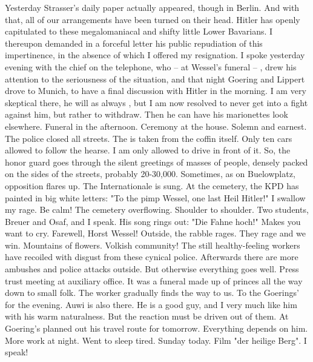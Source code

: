 Yesterday Strasser's daily paper actually appeared, though in Berlin. And with that, all of our arrangements have been turned on their head. Hitler has openly capitulated to these megalomaniacal and shifty little Lower Bavarians. I thereupon demanded in a forceful letter his public repudiation of this impertinence, in the absence of which I offered my resignation. I spoke yesterday evening with the chief on the telephone, who -- at Wessel's funeral -- , drew his attention to the seriousness of the situation, and  that night Goering and Lippert drove to Munich, to have a final discussion with Hitler in the morning. I am very skeptical there, he will as always , but I am now resolved to never get into a fight against him, but rather to withdraw. Then he can have his marionettes look elsewhere. Funeral in the afternoon. Ceremony at the house. Solemn and earnest. The police closed all streets. The  is taken from the coffin itself. Only ten cars allowed to follow the hearse. I am only allowed to drive in front of it. So, the honor guard goes through the silent greetings of masses of people, densely packed on the sides of the streets, probably 20-30,000. Sometimes, as on Buelowplatz, opposition flares up. The Internationale is sung. At the cemetery, the KPD has painted in big white letters: "To the pimp Wessel, one last Heil Hitler!" I swallow my rage. Be calm! The cemetery overflowing. Shoulder to shoulder. Two students, Breuer and Osaf, and I speak. His song rings out: "Die Fahne hoch!" Makes you want to cry. Farewell, Horst Wessel! Outside, the rabble rages. They rage and we win. Mountains of flowers. Volkish community! The still healthy-feeling workers have recoiled with disgust from these cynical police. Afterwards there are more ambushes and police attacks outside. But otherwise everything goes well. Press trust meeting at auxiliary office. It was a funeral made up of princes all the way down to small folk. The worker gradually finds the way to us. To the Goerings' for the evening. Auwi is also there.  He is a good guy, and I very much like him with his warm naturalness. But the reaction must be driven out of them. At Goering's planned out his travel route for tomorrow. Everything depends on him. More work at night. Went to sleep tired. Sunday today. Film "der heilige Berg". I speak!

